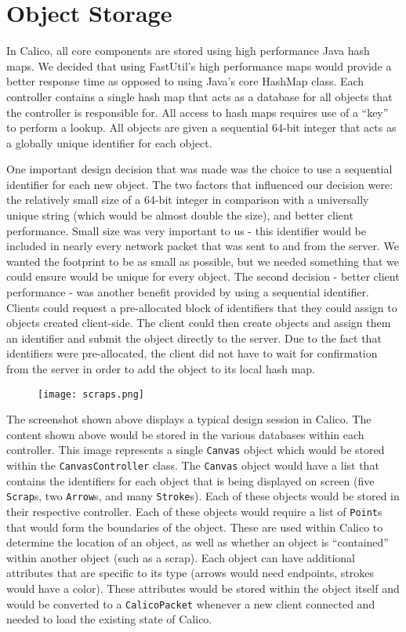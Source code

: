\section{Object Storage}
In Calico, all core components are stored using high performance Java hash maps. 
We decided that using FastUtil's\cite{fastutil} high performance maps would provide a better response time as opposed to using Java's core HashMap class. 
Each controller contains a single hash map that acts as a database for all objects that the controller is responsible for.
All access to hash maps requires use of a ``key'' to perform a lookup.
All objects are given a sequential 64-bit integer that acts as a globally unique identifier for each object.

One important design decision that was made was the choice to use a sequential identifier for each new object. The two factors that influenced our decision were: the relatively small size of a 64-bit integer in comparison with a universally unique string (which would be almost double the size), and better client performance.
Small size was very important to us - this identifier would be included in nearly every network packet that was sent to and from the server. We wanted the footprint to be as small as possible, but we needed something that we could ensure would be unique for every object. 
The second decision - better client performance - was another benefit provided by using a sequential identifier. Clients could request a pre-allocated block of identifiers that they could assign to objects created client-side. The client could then create objects and assign them an identifier and submit the object directly to the server. Due to the fact that identifiers were pre-allocated, the client did not have to wait for confirmation from the server in order to add the object to its local hash map.

\begin{figure}[htb]
  \centering
  \texttt{[image: scraps.png]}
  \label{fig:scraps_storage}
\end{figure}

The screenshot shown above displays a typical design session in Calico. The content shown above would be stored in the various databases within each controller. This image represents a single \texttt{Canvas} object which would be stored within the \texttt{CanvasController} class. The \texttt{Canvas} object would have a list that contains the identifiers for each object that is being displayed on screen (five \texttt{Scrap}s, two \texttt{Arrow}s, and many \texttt{Stroke}s). Each of these objects would be stored in their respective controller. Each of these objects would require a list of \texttt{Point}s that would form the boundaries of the object. These are used within Calico to determine the location of an object, as well as whether an object is ``contained'' within another object (such as a scrap). Each object can have additional attributes that are specific to its type (arrows would need endpoints, strokes would have a color). These attributes would be stored within the object itself and would be converted to a \texttt{CalicoPacket} whenever a new client connected and needed to load the existing state of Calico.

